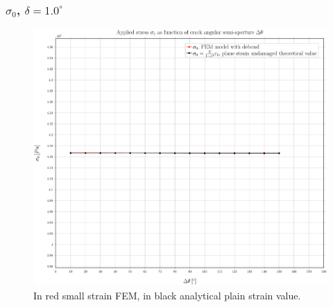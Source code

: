 \documentclass[first,firstsupp,lastsupp,handout,last,hyperref,table]{ETHclass}
\begin{document}
\begin{frame}
\frametitle{\small $\sigma_{0}$, $\delta=1.0^{\circ}$}
\vspace{-0.5cm}
\centering
\captionsetup[figure]{font=scriptsize,labelfont=scriptsize}
\begin{figure}[!h]
\centering
\includegraphics[height=0.7\textheight]{2017-07-10_AbqRunSummary_SmallStrainD10_sigma-inf_Summary.pdf}
  \caption{\scriptsize In red small strain FEM, in black analytical plain strain value.}
  \label{fig:res1}
\end{figure}
\end{frame}
\end{document}
